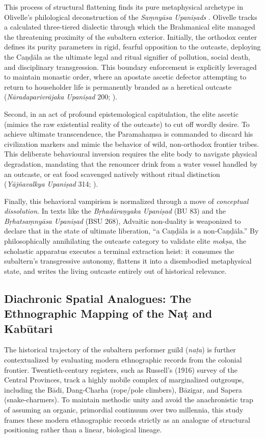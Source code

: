 \documentclass[11pt,twoside,letterpaper]{article}
\begin{document}
This process of structural flattening finds its pure metaphysical archetype in Olivelle's philological deconstruction of the \textit{Saṃnyāsa Upaniṣads} \cite{olivelle1992}. Olivelle tracks a calculated three-tiered dialectic through which the Brahmanical elite managed the threatening proximity of the subaltern exterior. Initially, the orthodox center defines its purity parameters in rigid, fearful opposition to the outcaste, deploying the Caṇḍāla as the ultimate legal and ritual signifier of pollution, social death, and disciplinary transgression. This boundary enforcement is explicitly leveraged to maintain monastic order, where an apostate ascetic defector attempting to return to householder life is permanently branded as a heretical outcaste (\textit{Nāradaparivrājaka Upaniṣad} 200; \cite{olivelle1992}).

Second, in an act of profound epistemological capitulation, the elite ascetic (mimics the raw existential reality of the outcaste) to cut off wordly desire. To achieve ultimate transcendence, the Paramahaṃsa is commanded to discard his civilization markers and mimic the behavior of wild, non-orthodox frontier tribes. This deliberate behavioural inversion requires the elite body to navigate physical degradation, mandating that the renouncer drink from a water vessel handled by an outcaste, or eat food scavenged natively without ritual distinction (\textit{Yājñavalkya Upaniṣad} 314; \cite{olivelle1992}).

Finally, this behavioral vampirism is normalized through a move of \textit{conceptual dissolution}. In texts like the \textit{Bṛhadāraṇyaka Upaniṣad} (BU 83) and the \textit{Bṛhatsaṃnyāsa Upaniṣad} (BSU 268), Advaitic non-duality is weaponized to declare that in the state of ultimate liberation, ``a Caṇḍāla is a non-Caṇḍāla.'' By philosophically annihilating the outcaste category to validate elite \textit{mokṣa}, the scholastic apparatus executes a terminal extraction heist: it consumes the subaltern's transgressive autonomy, flattens it into a disembodied metaphysical state, and writes the living outcaste entirely out of historical relevance.

\subsection{Diachronic Spatial Analogues: The Ethnographic Mapping of the Naṭ and Kabūtari}

The historical trajectory of the subaltern performer guild (\textit{naṭa}) is further contextualized by evaluating modern ethnographic records from the colonial frontier. Twentieth-century registers, such as Russell’s (1916) survey of the Central Provinces, track a highly mobile complex of marginalized outgroups, including the Bādi, Dang-Charha (rope/pole climbers), Bāzigar, and Sapera (snake-charmers). To maintain methodic unity and avoid the anachronistic trap of assuming an organic, primordial continuum over two millennia, this study frames these modern ethnographic records strictly as an analogue of structural positioning rather than a linear, biological lineage.
\end{document}
